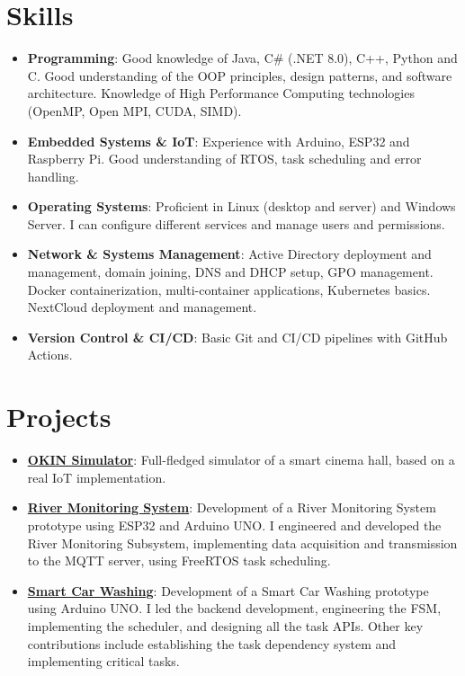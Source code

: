 \documentclass[letterpaper,11pt]{article}
\newcommand{\resumeItem}[2]{
  \item\small{
    \textbf{#1}{: #2 \vspace{-2pt}}
  }
}
\newcommand{\resumeSubItem}[2]{\resumeItem{#1}{#2}\vspace{-4pt}}
\newcommand{\resumeSubHeadingListStart}{\begin{itemize}[leftmargin=*]}
\newcommand{\resumeSubHeadingListEnd}{\end{itemize}}
\begin{document}
\section{Skills}
  \resumeSubHeadingListStart
    \item{
      \textbf{Programming}{: Good knowledge of Java, C\# (.NET 8.0), C++, Python and C. 
        Good understanding of the OOP principles, design patterns, and software architecture.
        Knowledge of High Performance Computing technologies (OpenMP, Open MPI, CUDA, SIMD).}
      \hfill
      }
    \item{
      \textbf{Embedded Systems \& IoT}{: Experience with Arduino, ESP32 and Raspberry Pi. Good understanding of RTOS, task scheduling and error handling.}
      \hfill
      }
    \item{
      \textbf{Operating Systems}{: Proficient in Linux (desktop and server) and Windows Server. I can configure different services and manage users and permissions.}
        \hfill
      }
    \item{
      \textbf{Network \& Systems Management}{: Active Directory deployment and management, domain joining, DNS and DHCP setup, GPO management. 
        Docker containerization, multi-container applications, Kubernetes basics. NextCloud deployment and management.}
      \hfill
      }
    \item{
        \textbf{Version Control \& CI/CD}{: Basic Git and CI/CD pipelines with GitHub Actions.}
        \hfill
      }
 \resumeSubHeadingListEnd

\section{Projects}
  \resumeSubHeadingListStart
  \resumeSubItem{\href{https://github.com/aleemont1/OKINsimulator}{OKIN Simulator}}
      {Full-fledged simulator of a smart cinema hall, based on a real IoT implementation.}
    \resumeSubItem{\href{https://github.com/aleemont1/esiot-23-24-assignment3/}{River Monitoring System}}
      {Development of a River Monitoring System prototype using ESP32 and Arduino UNO.
       I engineered and developed the River Monitoring Subsystem, implementing data acquisition and
       transmission to the MQTT server, using FreeRTOS task scheduling.}
    \resumeSubItem{\href{https://github.com/aleemont1/esiot-23-24-assignment2/}{Smart Car Washing}}
      {Development of a Smart Car Washing prototype using Arduino UNO. 
      I led the backend development, engineering the FSM, implementing the scheduler, and designing all the task APIs. 
      Other key contributions include establishing the task dependency system and implementing critical tasks.}
  \resumeSubHeadingListEnd
\end{document}

